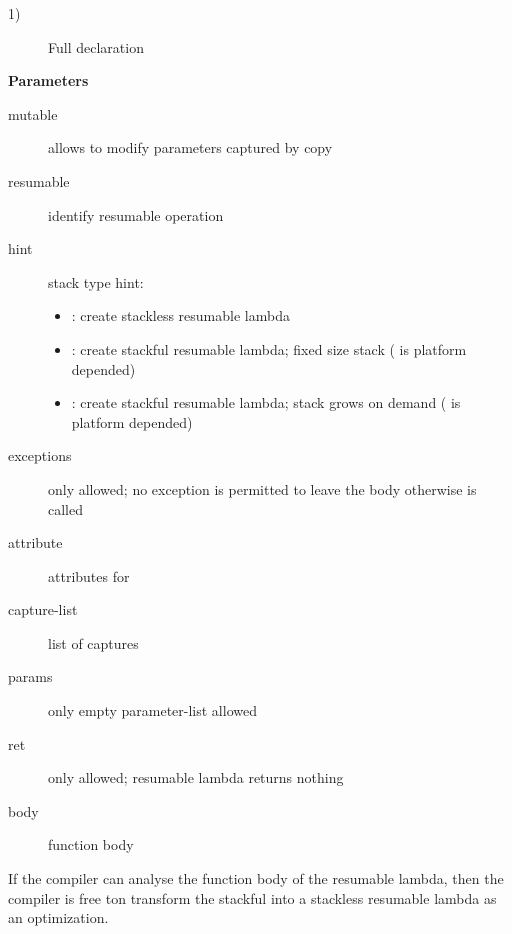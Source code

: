 \begin{description}
    \item[1)] Full declaration
\end{description}

{\bf Parameters}
\begin{description}
    \item[mutable]      allows to modify parameters captured by copy
    \item[resumable]    identify resumable operation
    \item[hint]         stack type hint:
                        \begin{itemize}
                            \item <no hint specified>: create stackless
                                  resumable lambda
                            \item {}:
                                  create stackful resumable lambda;
                                  fixed size stack ( is
                                  platform depended)
                            \item {}:
                                  create stackful resumable lambda;
                                  stack grows on demand (
                                  is platform depended)
                        \end{itemize}
    \item[exceptions]   only  allowed; no exception is
                        permitted to leave the body otherwise
                         is called
    \item[attribute]    attributes for 
    \item[capture-list] list of captures
    \item[params]       only empty parameter-list allowed
    \item[ret]          only  allowed; resumable lambda returns nothing
    \item[body]         function body\\
\end{description}

If the compiler can analyse the function body of the resumable lambda, then the
compiler is free ton transform the stackful into a stackless resumable lambda as
an optimization.
